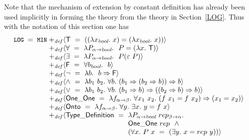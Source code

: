 Note that the mechanism of extension by constant definition has
already been used implicitly in forming the theory  from
the theory  in Section~\ref{LOG}. Thus with the notation
of this section one has
\[
\theory{LOG}\; =\; \theory{MIN}\;\begin{array}[t]{@{}l}
   {+_{\it def}} \langle \T\index{T@\ml{T}!abstract form of}\index{truth values, in HOL logic@truth values, in \HOL\ logic!abstract form of} \ =\
     ((\lquant{x_{\ty{bool}}}x) = (\lquant{x_{\ty{bool}}}x))\rangle\\
   {+_{\it def}}\langle {\forall}\index{universal quantifier, in HOL logic@universal quantifier, in \HOL\ logic!abstract form of}\ =\ \lquant{P_{\alpha\fun\ty{bool}}}\ P =
     (\lquant{x}\T )\rangle\\
   {+_{\it def}}\langle {\exists}\index{existential quantifier, in HOL logic@existential quantifier, in \HOL\ logic!abstract form of}\ =\
     \lquant{P_{\alpha\fun\ty{bool}}}\ P({\hilbert}\ P)\rangle\\
   {+_{\it def}}\langle \F\index{F@\ml{F}!abstract form of}
 \ =\ \uquant{b_{\ty{bool}}}\ b\rangle\\
   {+_{\it def}}\langle \neg\ =\ \lquant{b}\ b \imp \F \rangle\index{negation, in HOL logic@negation, in \HOL\ logic!abstract form of}\\
   {+_{\it def}}\langle {\wedge}\index{conjunction, in HOL logic@conjunction, in \HOL\ logic!abstract form of}\ =\ \lquant{b_1\ b_2}\uquant{b}
     (b_1\imp (b_2 \imp b)) \imp b\rangle\\
   {+_{\it def}}\langle {\vee}\index{disjunction, in HOL logic@disjunction, in \HOL\ logic!abstract form of}\ =\ \lquant{b_1\ b_2}\uquant{b}
     (b_1 \imp b)\imp ((b_2 \imp b) \imp b)\rangle\\
   {+_{\it def}}\langle\OneOne \ =\ \lquant{f_{\alpha \fun\beta}}
     \uquant{x_1\ x_2} (f\ x_1 = f\ x_2)  \imp (x_1 = x_2)\rangle\index{one-to-one predicate, in HOL logic@one-to-one predicate, in \HOL\ logic!abstract form of}\\
   {+_{\it def}}\langle\Onto \  =\ \lquant{f_{\alpha\fun\beta}}\index{onto predicate, in HOL logic@onto predicate, in \HOL\ logic!abstract form of}
     \uquant{y}\equant{x} y = f\ x\rangle\\
   {+_{\it def}}\langle\TyDef \  =\
        \begin{array}[t]{@{}l}
          \lambda P_{\alpha\fun\ty{bool}}\ rep_{\beta\fun\alpha}.\\
          \OneOne\ rep\ \ \wedge\\
          (\uquant{x}P\ x \ =\ (\equant{y} x = rep\ y)) \rangle\\
\end{array}\end{array}
\]

